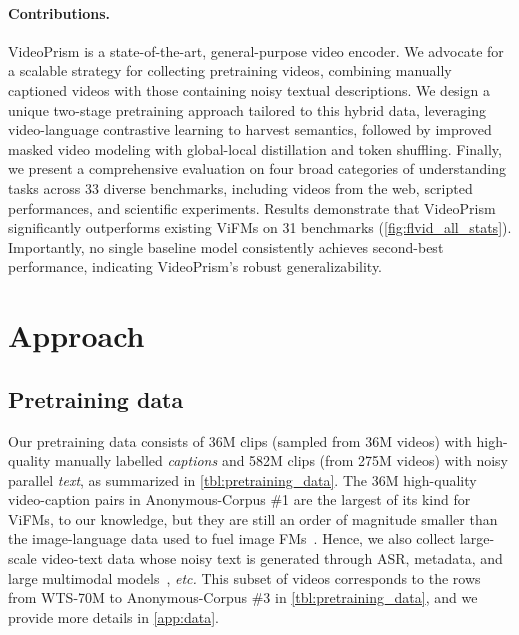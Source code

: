 \documentclass{article}
\theoremstyle{plain}
\theoremstyle{definition}
\theoremstyle{remark}
\newcommand{\OURS}{VideoPrism\xspace}
\newcommand{\etc}{\textit{etc.}\xspace}
\newcommand{\myparagraph}[1]{\paragraph{#1}}
\begin{document}
\myparagraph{Contributions.} 
\OURS is a state-of-the-art, general-purpose video encoder. 
We advocate for a scalable strategy for collecting pretraining videos, combining manually captioned videos with those containing noisy textual descriptions.
We design a unique two-stage pretraining approach tailored to this hybrid data, leveraging video-language contrastive learning to harvest semantics, followed by improved masked video modeling with global-local distillation and token shuffling.
Finally, we present a comprehensive evaluation on four broad categories of understanding tasks across 33 diverse benchmarks, including videos from the web, scripted performances, and scientific experiments. 
Results demonstrate that \OURS significantly outperforms existing ViFMs on 31 benchmarks (\cref{fig:flvid_all_stats}). Importantly, no single baseline model consistently achieves second-best performance, indicating \OURS's robust generalizability.































%
 \section{Approach}

\subsection{Pretraining data}
\label{sec:app:data}
Our pretraining data consists of 36M clips (sampled from 36M videos) with high-quality manually labelled \emph{captions} and 582M clips (from 275M videos) with noisy parallel \emph{text}, as summarized in \cref{tbl:pretraining_data}. 
The 36M high-quality video-caption pairs in Anonymous-Corpus \#1 are the largest of its kind for ViFMs, to our knowledge, but they are still an order of magnitude smaller than the image-language data used to fuel image FMs~\cite{radford2021learning,yu2022coca}. Hence, we also collect large-scale video-text data whose noisy text is generated through ASR, metadata, and large multimodal models~\cite{wang2023internvid,zhao2024distilling}, \etc This subset of videos corresponds to the rows from WTS-70M to Anonymous-Corpus \#3 in \cref{tbl:pretraining_data}, and we provide more details in \cref{app:data}. 
\end{document}
